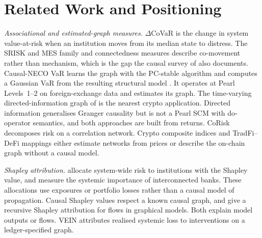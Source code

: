 \documentclass[referee,pdflatex,sn-mathphys-ay]{sn-jnl}
\theoremstyle{thmstyleone}%
\theoremstyle{thmstyletwo}%
\theoremstyle{thmstylethree}%
\begin{document}
\section{Related Work and Positioning}
\label{sec:related}

\emph{Associational and estimated-graph measures.} $\Delta$CoVaR \citep{adrian2016covar} is the change in
system value-at-risk when an institution moves from its median state to distress. The
SRISK and MES family \citep{acharya2017measuring} and connectedness measures
\citep{diebold2014network,billio2012econometric} describe co-movement rather than mechanism, which is the gap the causal
survey of \citet{kumar2025causalreview} also documents. Causal-NECO VaR \citep{rigana2024neco} learns the graph
with the PC-stable algorithm \citep{colombo2014order} and computes a Gaussian VaR from the
resulting structural model \citep{rigana2023new,spirtes2000causation}. It operates at
Pearl Levels~1--2 on foreign-exchange data and estimates its graph. The time-varying
directed-information graph of \citet{etesami2023tvdig} is the nearest crypto application. Directed information
generalises Granger causality \citep{granger1969} but is not a Pearl SCM with do-operator semantics, and both approaches are
built from returns. CoRisk \citep{giudici2018corisk} decomposes risk on a correlation network. Crypto composite
indices \citep{farzulla2026asri} and TradFi--DeFi mappings \citep{aufiero2025mapping} either estimate networks from prices or
describe the on-chain graph without a causal model.

\emph{Shapley attribution.} \citet{tarashev2016attributing}
allocate system-wide risk to institutions with the Shapley value, and
\citet{drehmann2013measuring} measure the systemic importance of interconnected banks.
These allocations use exposures or portfolio losses rather than a causal model of
propagation. Causal Shapley values \citep{heskes2020causal} respect a known causal graph,
and \citet{singal2021flow} give a recursive Shapley attribution for flows in graphical
models. Both explain model outputs or flows. VEIN attributes realised systemic loss to
interventions on a ledger-specified graph.
\end{document}
